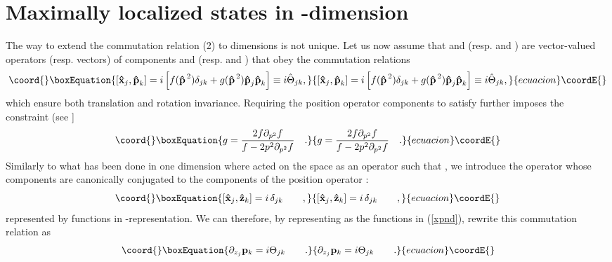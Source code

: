 \documentclass[a4paper,10pt]{article}
\providecommand{\x}{\mbox{\rm{\bf \^ x}}}
\providecommand{\p}{\mbox{\rm{\bf \^ p}}}
\providecommand{\z}{\mbox{\rm{\bf \^ z}}}
\providecommand{\xj}{\mbox{\rm{\bf \^ x}}_j}
\providecommand{\xk}{\mbox{\rm{\bf \^ x}}_k}
\providecommand{\pk}{\mbox{\rm{\bf \^ p}}_k}
\providecommand{\zk}{\mbox{\rm{\bf \^ z}}_k}
\providecommand{\pj}{\mbox{\rm{\bf \^ p}}_j}
\providecommand{\cL}{{\cal L}}
\begin{document}
\section{Maximally localized states in \coordHE{}-dimension }
The way to extend the commutation relation (2) to \coordHE{} dimensions
is not unique. Let us now assume that \myHighlight{$\x$}\coordHE{} and \myHighlight{$\p$}\coordHE{} (resp. \coordHE{}
and \coordHE{}) are vector-valued operators (resp. vectors) of
components \myHighlight{$\xj$}\coordHE{} and \myHighlight{$\pk$}\coordHE{} (resp. \coordHE{} and \coordHE{})
that obey the commutation relations
\begin{equation}\coord{}\boxEquation{ [\x_j ,\pk] =
i \left[f(\p ^{\,2})\delta_{jk}+g(\p^{\,2}) \pj \pk \right] \equiv
i \hat \Theta_{jk} \label{xpnd} ,
}{ [\x_j ,\pk] =
i \left[f(\p ^{\,2})\delta_{jk}+g(\p^{\,2}) \pj \pk \right] \equiv
i \hat \Theta_{jk} ,
}{ecuacion}\coordE{}\end{equation}
which ensure both translation and rotation invariance. Requiring
the position operator components to satisfy \myHighlight{$[\x_j ,\xk]=0$}\coordHE{}
further imposes the constraint (see \cite{AK}]
\begin{equation}\coord{}\boxEquation{
g = \frac{2 f \partial_{p^2} f}{f-2 p^2 \partial_{p^2}f} \quad
.\label{tc}
}{
g = \frac{2 f \partial_{p^2} f}{f-2 p^2 \partial_{p^2}f} \quad
.}{ecuacion}\coordE{}\end{equation}
Similarly to what has been done in one dimension where \coordHE{}
acted on the space \myHighlight{${\cL}^2([\alpha_-,\alpha_+],dz)$}\coordHE{} as an
operator such that \myHighlight{$[\x,\z] = i$}\coordHE{}, we introduce the operator \myHighlight{$\z$}\coordHE{}
whose components are canonically conjugated to the components of
the position operator :
\begin{equation}\coord{}\boxEquation{
[\xj, \zk] = i \, \delta_{jk} \qquad , \label{xznd}
}{
[\xj, \zk] = i \, \delta_{jk} \qquad , }{ecuacion}\coordE{}\end{equation}
represented by functions \coordHE{} in
\coordHE{}-representation. We can therefore, by representing \myHighlight{$\pj$}\coordHE{} as the
functions \coordHE{} in (\ref{xpnd}), rewrite this
commutation relation as
\begin{equation}\coord{}\boxEquation{
\partial_{z_j}{\bf p}_k = i \Theta_{jk} \qquad .\label{A}
}{
\partial_{z_j}{\bf p}_k = i \Theta_{jk} \qquad .}{ecuacion}\coordE{}\end{equation}
\end{document}
